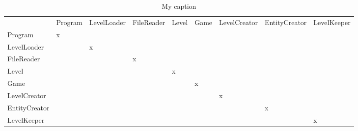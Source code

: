 \begin{table}[]
\centering
\caption{My caption}
\label{my-label}
\begin{tabular}{lllllllll}
              & Program & LevelLoader & FileReader & Level & Game & LevelCreator & EntityCreator & LevelKeeper \\
Program       & x       &             &            &       &      &              &               &             \\
LevelLoader   &         & x           &            &       &      &              &               &             \\
FileReader    &         &             & x          &       &      &              &               &             \\
Level         &         &             &            & x     &      &              &               &             \\
Game          &         &             &            &       & x    &              &               &             \\
LevelCreator  &         &             &            &       &      & x            &               &             \\
EntityCreator &         &             &            &       &      &              & x             &             \\
LevelKeeper   &         &             &            &       &      &              &               & x          
\end{tabular}
\end{table}
